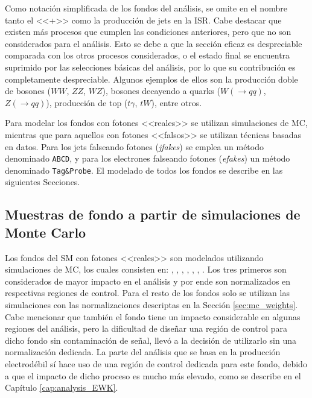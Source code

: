Como notación simplificada de los fondos del análisis, se omite en el nombre tanto el <<+>> como la producción de jets en la ISR. Cabe destacar que existen más procesos que cumplen las condiciones anteriores, pero que no son considerados para el análisis. Esto se debe a que la sección eficaz es despreciable comparada con los otros procesos considerados, o el estado final se encuentra suprimido por las selecciones básicas del análisis, por lo que su contribución es completamente despreciable. Algunos ejemplos de ellos son la producción doble de bosones ($WW$, $ZZ$, $WZ$), bosones decayendo a quarks ($W(\rightarrow qq)$, $Z(\rightarrow qq)$), producción de top ($t\gamma$, $tW$), entre otros.

Para modelar los fondos con fotones <<reales>> se utilizan simulaciones de MC, mientras que para aquellos con fotones <<falsos>> se utilizan técnicas basadas en datos. 
Para los jets falseando fotones (\textit{jfakes}) se emplea un método denominado \texttt{ABCD}, y para los electrones falseando fotones (\textit{efakes}) un método denominado \texttt{Tag\&Probe}. El modelado de todos los fondos se describe en las siguientes Secciones.

\subsection{Muestras de fondo a partir de simulaciones de Monte Carlo}

Los fondos del SM con fotones <<reales>> son modelados utilizando simulaciones de MC, los cuales consisten en: \phj, \wph, \ttbarph, \wphph, \zph, \zphph, \phph. Los tres primeros son considerados de mayor impacto en el análisis y por ende son normalizados en respectivas regiones de control. Para el resto de los fondos solo se utilizan las simulaciones con las normalizaciones descriptas en la Sección \ref{sec:mc_weights}. 
Cabe mencionar que también el fondo \znunuph tiene un impacto considerable en algunas regiones del análisis, pero la dificultad de diseñar una región de control para dicho fondo sin contaminación de señal, llevó a la decisión de utilizarlo sin una normalización dedicada. 
La parte del análisis que se basa en la producción electrodébil sí hace uso de una región de control dedicada para este fondo, debido a que el impacto de dicho proceso es mucho más elevado, como se describe en el Capítulo \ref{cap:analysis_EWK}.


